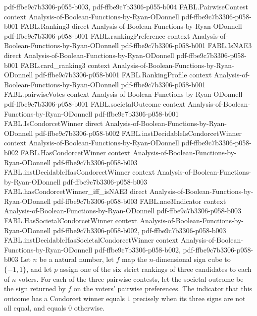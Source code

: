 \begin{theorem}
  {pdf-ffbe9c7b3306-p055-b003,
    pdf-ffbe9c7b3306-p055-b004}
\proofstep
  {FABL.PairwiseContest}
  {context}
  {Analysis-of-Boolean-Functions-by-Ryan-ODonnell}
  {pdf-ffbe9c7b3306-p058-b001}
\proofstep
  {FABL.Ranking3}
  {direct}
  {Analysis-of-Boolean-Functions-by-Ryan-ODonnell}
  {pdf-ffbe9c7b3306-p058-b001}
\proofstep
  {FABL.rankingPreference}
  {context}
  {Analysis-of-Boolean-Functions-by-Ryan-ODonnell}
  {pdf-ffbe9c7b3306-p058-b001}
\proofstep
  {FABL.IsNAE3}
  {direct}
  {Analysis-of-Boolean-Functions-by-Ryan-ODonnell}
  {pdf-ffbe9c7b3306-p058-b001}
\proofstep
  {FABL.card_ranking3}
  {context}
  {Analysis-of-Boolean-Functions-by-Ryan-ODonnell}
  {pdf-ffbe9c7b3306-p058-b001}
\proofstep
  {FABL.RankingProfile}
  {context}
  {Analysis-of-Boolean-Functions-by-Ryan-ODonnell}
  {pdf-ffbe9c7b3306-p058-b001}
\proofstep
  {FABL.pairwiseVotes}
  {context}
  {Analysis-of-Boolean-Functions-by-Ryan-ODonnell}
  {pdf-ffbe9c7b3306-p058-b001}
\proofstep
  {FABL.societalOutcome}
  {context}
  {Analysis-of-Boolean-Functions-by-Ryan-ODonnell}
  {pdf-ffbe9c7b3306-p058-b001}
\proofstep
  {FABL.IsCondorcetWinner}
  {direct}
  {Analysis-of-Boolean-Functions-by-Ryan-ODonnell}
  {pdf-ffbe9c7b3306-p058-b002}
\proofstep
  {FABL.instDecidableIsCondorcetWinner}
  {context}
  {Analysis-of-Boolean-Functions-by-Ryan-ODonnell}
  {pdf-ffbe9c7b3306-p058-b002}
\proofstep
  {FABL.HasCondorcetWinner}
  {context}
  {Analysis-of-Boolean-Functions-by-Ryan-ODonnell}
  {pdf-ffbe9c7b3306-p058-b003}
\proofstep
  {FABL.instDecidableHasCondorcetWinner}
  {context}
  {Analysis-of-Boolean-Functions-by-Ryan-ODonnell}
  {pdf-ffbe9c7b3306-p058-b003}
\proofstep
  {FABL.hasCondorcetWinner_iff_isNAE3}
  {direct}
  {Analysis-of-Boolean-Functions-by-Ryan-ODonnell}
  {pdf-ffbe9c7b3306-p058-b003}
\proofstep
  {FABL.nae3Indicator}
  {context}
  {Analysis-of-Boolean-Functions-by-Ryan-ODonnell}
  {pdf-ffbe9c7b3306-p058-b003}
\proofstep
  {FABL.HasSocietalCondorcetWinner}
  {context}
  {Analysis-of-Boolean-Functions-by-Ryan-ODonnell}
  {pdf-ffbe9c7b3306-p058-b002,
    pdf-ffbe9c7b3306-p058-b003}
\proofstep
  {FABL.instDecidableHasSocietalCondorcetWinner}
  {context}
  {Analysis-of-Boolean-Functions-by-Ryan-ODonnell}
  {pdf-ffbe9c7b3306-p058-b002,
    pdf-ffbe9c7b3306-p058-b003}
Let $n$ be a natural number, let $f$ map the $n$-dimensional sign cube to $\{ -1,1
\}$, and let $p$ assign one of the six strict rankings of three candidates to each of
$n$ voters. For each of the three pairwise contests, let the societal outcome be the
sign returned by $f$ on the voters’ pairwise preferences. The indicator that this
outcome has a Condorcet winner equals $1$ precisely when its three signs are not all
equal, and equals $0$ otherwise.
\end{theorem}

